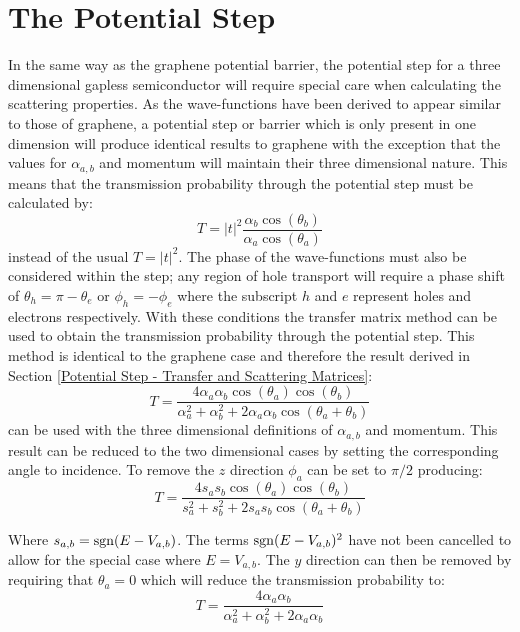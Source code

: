 		\section{The Potential Step}
		\label{weyl - The Step Potential}
			In the same way as the graphene potential barrier, the potential step for a three dimensional gapless semiconductor will require special care when calculating the scattering properties. As the wave-functions have been derived to appear similar to those of graphene, a potential step or barrier which is only present in one dimension will produce identical results to graphene with the exception that the values for $\alpha_{a,b}$ and momentum will maintain their three dimensional nature. This means that the transmission probability through the potential step must be calculated by:
			\begin{equation}
				T=|t|^{2}\frac{\alpha_{b}\cos(\theta_{b})}{\alpha_{a}\cos(\theta_{a})}
			\end{equation}
			instead of the usual $T=|t|^{2}$. The phase of the wave-functions must also be considered within the step; any region of hole transport will require a phase shift of $\theta_{h}=\pi-\theta_{e}$ or $\phi_{h}=-\phi_{e}$ where the subscript $h$ and $e$ represent holes and electrons respectively. With these conditions the transfer matrix method can be used to obtain the transmission probability through the potential step. This method is identical to the graphene case and therefore the result derived in Section \ref{Potential Step - Transfer and Scattering Matrices}:
		\begin{equation}
			T=\frac{4\alpha_{a}\alpha_{b}\cos(\theta_{a})\cos(\theta_{b})}{\alpha_{a}^{2}+\alpha_{b}^{2}+2\alpha_{a}\alpha_{b}\cos(\theta_{a}+\theta_{b})}
			\label{weyl - stept}
		\end{equation}
		can be used with the three dimensional definitions of $\alpha_{a,b}$ and momentum. This result can be reduced to the two dimensional cases by setting the corresponding angle to incidence. To remove the $z$ direction $\phi_{a}$ can be set to $\pi/2$ producing:
		\begin{equation}
			T=\frac{4s_{a}s_{b}\cos(\theta_{a})\cos(\theta_{b})}{s_{a}^{2}+s_{b}^{2}+2s_{a}s_{b}\cos(\theta_{a}+\theta_{b})}
			\label{}
		\end{equation}

		Where $s_{a,b}=\operatorname{sgn}(E-V_{a,b})$. The terms $\operatorname{sgn}(E-V_{a,b})^{2}$ have not been cancelled to allow for the special case where $E=V_{a,b}$. The $y$ direction can then be removed by requiring that $\theta_{a}=0$ which will reduce the transmission probability to:
		\begin{equation}
			T=\frac{4\alpha_{a}\alpha_{b}}{\alpha_{a}^{2}+\alpha_{b}^{2}+2\alpha_{a}\alpha_{b}}
			\label{}
		\end{equation}

